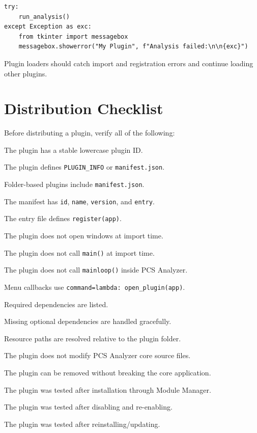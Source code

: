 \documentclass[11pt, a4paper]{article}
\begin{document}
\begin{lstlisting}[style=python]
try:
    run_analysis()
except Exception as exc:
    from tkinter import messagebox
    messagebox.showerror("My Plugin", f"Analysis failed:\n\n{exc}")
\end{lstlisting}

Plugin loaders should catch import and registration errors and continue loading other plugins.

\section{Distribution Checklist}

Before distributing a plugin, verify all of the following:

\begin{checklist}
  \item The plugin has a stable lowercase plugin ID.
  \item The plugin defines \texttt{PLUGIN\_INFO} or \texttt{manifest.json}.
  \item Folder-based plugins include \texttt{manifest.json}.
  \item The manifest has \texttt{id}, \texttt{name}, \texttt{version}, and \texttt{entry}.
  \item The entry file defines \texttt{register(app)}.
  \item The plugin does not open windows at import time.
  \item The plugin does not call \texttt{main()} at import time.
  \item The plugin does not call \texttt{mainloop()} inside PCS Analyzer.
  \item Menu callbacks use \texttt{command=lambda: open\_plugin(app)}.
  \item Required dependencies are listed.
  \item Missing optional dependencies are handled gracefully.
  \item Resource paths are resolved relative to the plugin folder.
  \item The plugin does not modify PCS Analyzer core source files.
  \item The plugin can be removed without breaking the core application.
  \item The plugin was tested after installation through Module Manager.
  \item The plugin was tested after disabling and re-enabling.
  \item The plugin was tested after reinstalling/updating.
\end{checklist}
\end{document}
